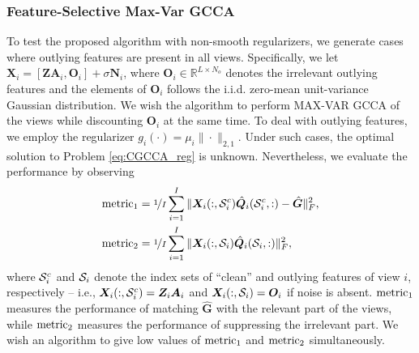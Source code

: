 \documentclass[10pt,journal]{IEEEtran}
\newcommand{\Q}{\boldsymbol{Q}}
\begin{document}
\subsubsection{Feature-Selective Max-Var GCCA}
To test the proposed algorithm with non-smooth regularizers,
we generate cases where outlying features are present in all views.
Specifically, we let ${\bm X}_i=[{\bm Z}{\bm A}_i,{\bm O}_i] + \sigma{\bm N}_i$,
where ${\bm O}_i\in\mathbb{R}^{L\times N_o}$ denotes the irrelevant outlying features and the elements of ${\bm O}_i$ follows the i.i.d. zero-mean unit-variance Gaussian distribution.
We wish the algorithm to perform MAX-VAR GCCA of the views while discounting ${\bm O}_i$ at the same time. 
To deal with outlying features, we employ the regularizer $g_i(\cdot)=\mu_i\|\cdot\|_{2,1}$.
Under such cases, the optimal solution to Problem \eqref{eq:CGCCA_reg} is unknown.
Nevertheless, we evaluate the performance by observing
\begin{align*}
{\rm metric}_1 &=\nicefrac{1}{I}\sum_{i=1}^I\|{\bm X}_i(:,{\cal S}_i^c)\hat{\Q}_i({\cal S}_i^c,:)-\hat{\bm G}\|_F^2,\\
 {\rm metric}_2 &= \nicefrac{1}{I}\sum_{i=1}^I\|{\bm X}_i(:,{\cal S}_i)\hat{\Q}_i({\cal S}_i,:)\|_F^2,
\end{align*}
where ${\cal S}^c_i$ and ${\cal S}_i$ denote the index sets of ``clean'' and outlying features of view $i$, respectively -- i.e., ${\bm X}_i(:,{\cal S}_i^c)={\bm Z}_i{\bm A}_i$ and ${\bm X}_i(:,{\cal S}_i)={\bm O}_i$ if noise is absent.
${\rm metric}_1$ measures the performance of matching $\hat{\bm G}$ with the relevant part of the views, while ${\rm metric}_2$ measures the performance of suppressing the irrelevant part.
We wish an algorithm to give low values of ${\rm metric}_1$ and ${\rm metric}_2$ simultaneously.
\end{document}
